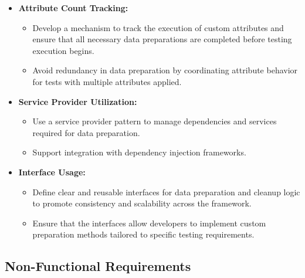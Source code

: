 \begin{itemize}
	\item \textbf{Attribute Count Tracking:}
	      \begin{itemize}
		      \item Develop a mechanism to track the execution of custom attributes and ensure that all necessary data preparations are completed before testing execution begins.
		      \item Avoid redundancy in data preparation by coordinating attribute behavior for tests with multiple attributes applied.
	      \end{itemize}

	\item \textbf{Service Provider Utilization:}
	      \begin{itemize}
		      \item Use a service provider pattern to manage dependencies and services required for data preparation.
		      \item Support integration with dependency injection frameworks.
	      \end{itemize}
	\item \textbf{Interface Usage:}
	      \begin{itemize}
		      \item Define clear and reusable interfaces for data preparation and cleanup logic to promote consistency and scalability across the framework.
		      \item Ensure that the interfaces allow developers to implement custom preparation methods tailored to specific testing requirements.
	      \end{itemize}
\end{itemize}

\subsection*{Non-Functional Requirements}

